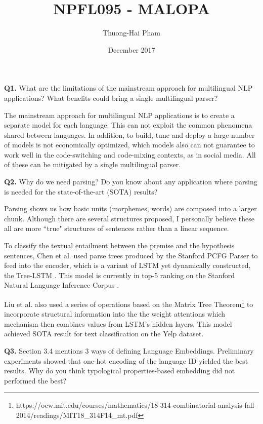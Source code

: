 \documentclass{article}
\title{NPFL095 - MALOPA}
\author{Thuong-Hai Pham}
\date{December 2017}
\begin{document}
\maketitle

\textbf{Q1.} What are the limitations of the mainstream approach for multilingual NLP applications? What benefits could bring a single multilingual parser?

The mainstream approach for multilingual NLP applications is to create a separate model for each language. This can not exploit the common phenomena shared between languages. In addition, to build, tune and deploy a large number of models is not economically optimized, which models also can not guarantee to work well in the code-switching and code-mixing contexts, as in social media. All of these can be mitigated by a single multilingual parser.

\bigskip

\textbf{Q2.} Why do we need parsing? Do you know about any application where parsing is needed for the state-of-the-art (SOTA) results?

Parsing shows us how basic units (morphemes, words) are composed into a larger chunk. Although there are several structures proposed, I personally believe these all are more ``true" structures of sentences rather than a linear sequence.

To classify the textual entailment between the premise and the hypothesis sentences, Chen et al. \cite{chen2016enhancing} used parse trees produced by the Stanford PCFG Parser \cite{klein2003accurate} to feed into the encoder, which is a variant of LSTM yet dynamically constructed, the Tree-LSTM \cite{tai2015improved}. This model is currently in top-5 ranking on the Stanford Natural Language Inference Corpus \cite{snli:emnlp2015}.

    Liu et al. \cite{liu2017learning} also used a series of operations based on the Matrix Tree
Theorem\footnote{https://ocw.mit.edu/courses/mathematics/18-314-combinatorial-analysis-fall-2014/readings/MIT18\_314F14\_mt.pdf} to incorporate structural information into the the weight attentions which mechanism then combines values from LSTM's hidden layers. This model achieved SOTA result for text classification on the Yelp dataset.

\bigskip

\textbf{Q3.} Section 3.4 mentions 3 ways of defining Language Embeddings. Preliminary experiments showed that one-hot encoding of the language ID yielded the best results. Why do you think typological properties-based embedding did not performed the best?
\end{document}
